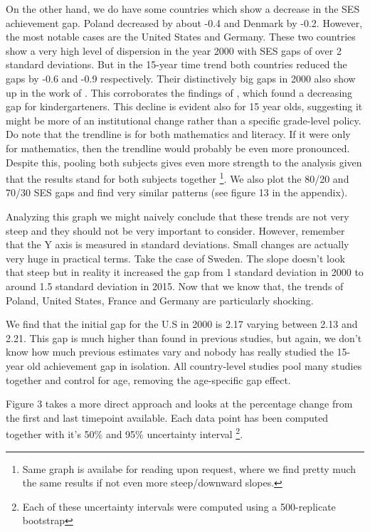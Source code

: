\documentclass[11pt, a4paper]{article}\usepackage[]{graphicx}\usepackage[]{color}
\begin{document}
On the other hand, we do have some countries which show a decrease in the SES achievement gap. Poland decreased by about -0.4 and Denmark by -0.2. However, the most notable cases are the United States and Germany. These two countries show a very high level of dispersion in the year 2000 with SES gaps of over 2 standard deviations. But in the 15-year time trend both countries reduced the gaps by -0.6 and -0.9 respectively. Their distinctively big gaps in 2000 also show up in the work of \citet{micklewright}. This corroborates the findings of \citet{reardon_portilla}, which found a decreasing gap for kindergarteners. This decline is evident also for 15 year olds, suggesting it might be more of an institutional change rather than a specific grade-level policy. Do note that the trendline is for both mathematics and literacy. If it were only for mathematics, then the trendline would probably be even more pronounced. Despite this, pooling both subjects gives even more strength to the analysis given that the results stand for both subjects together \footnote{Same graph is availabe for reading upon request, where we find pretty much the same results if not even more steep/downward slopes.}. We also plot the 80/20 and 70/30 SES gaps and find very similar patterns (see figure 13 in the appendix).

Analyzing this graph we might naively conclude that these trends are not very steep and they should not be very important to consider. However, remember that the Y axis is measured in standard deviations. Small changes are actually very huge in practical terms. Take the case of Sweden. The slope doesn't look that steep but in reality it increased the gap from 1 standard deviation in 2000 to around 1.5 standard deviation in 2015. Now that we know that, the trends of Poland, United States, France and Germany are particularly shocking.



We find that the initial gap for the U.S in 2000 is 2.17 varying between 2.13 and 2.21. This gap is much higher than found in previous studies, but again, we don't know how much previous estimates vary and nobody has really studied the 15-year old achievement gap in isolation. All country-level studies pool many studies together and control for age, removing the age-specific gap effect.

Figure 3 takes a more direct approach and looks at the percentage change from the first and last timepoint available. Each data point has been computed together with it's 50\% and 95\% uncertainty interval \footnote{Each of these uncertainty intervals were computed using a 500-replicate bootstrap}.
\end{document}
